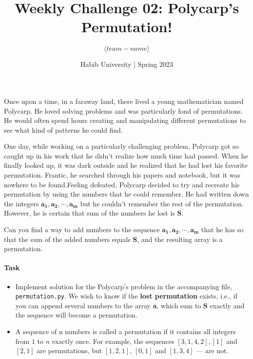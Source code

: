 \documentclass[a4paper]{exam}
\title{Weekly Challenge 02: Polycarp's Permutation!}
\author{$\langle team-name \rangle$}  %
\date{Habib University | Spring 2023}
\begin{document}
\maketitle

\begin{questions}

    Once upon a time, in a faraway land, there lived a young mathematician named Polycarp.
    He loved solving problems and was particularly fond of permutations. He would often
    spend hours creating and manipulating different permutations to see what kind of
    patterns he could find.

    One day, while working on a particularly challenging problem, Polycarp got so caught up
    in his work that he didn't realize how much time had passed. When he finally looked up,
    it was dark outside and he realized that he had lost his favorite permutation. Frantic,
    he searched through his papers and notebook, but it was nowhere to be found.Feeling
    defeated, Polycarp decided to try and recreate his permutation by using the numbers
    that he could remember. He had written down the integers $\mathbf{a_1, a_2, \cdots , a_m}$
    but he couldn't remember the rest of the permutation.  However, he is certain that
    sum of the numbers he lost is $\mathbf{S}$.

    Can you find a way to add numbers to the sequence $\mathbf{a_1,a_2,\cdots, a_m}$ that he has
    so that the sum of the added numbers equals $\mathbf{S}$, and the resulting array is a permutation.




    \paragraph{Task}
    \begin{itemize}
        \item Implement solution for the Polycarp's problem in the accompanying file,  \texttt{permutation.py}.
              We wish to know if the \textbf{lost permutation} exists, i.e., if you can append several numbers to the array \textbf{a}, which sum to $\mathbf{S}$ exactly and the sequence will become a permutation. 

        \item A sequence of n numbers is called a permutation if it contains all integers from $1$ to $n$
              exactly once. For example, the sequences $[3,1,4,2], [1]$  and $[2,1]$ are permutations, but $[1,2,1]$,
              $[0,1]$ and $[1,3,4]$ — are not.


\end{itemize}
\end{questions}
\end{document}
